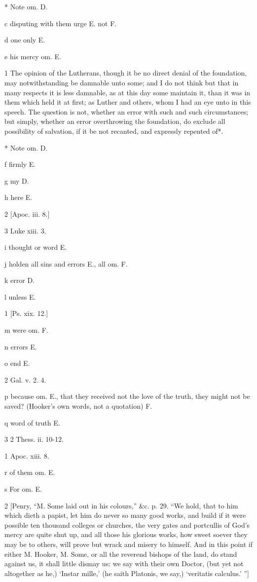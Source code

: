 *
Note om. D.

c
disputing with them urge E. not F.

d
one only E.

e
his mercy om. E.

1
The opinion of the Lutherans, though it be no direct denial of the foundation, may notwithstanding be damnable unto some; and I do not think but that in many respects it is less damnable, as at this day some maintain it, than it was in them which held it at first; as Luther and others, whom I had an eye unto in this speech. The question is not, whether an error with such and such circumstances; but simply, whether an error overthrowing the foundation, do exclude all possibility of salvation, if it be not recanted, and expressly repented of*.

*
Note om. D.

f
firmly E.

g
my D.

h
here E.

2
[Apoc. iii. 8.]

3
Luke xiii. 3.

i
thought or word E.

j
holden all sins and errors E., all om. F.

k
error D.

l
unless E.

1
[Ps. xix. 12.]

m
were om. F.

n
errors E.

o
end E.

2
Gal. v. 2. 4.

p
because om. E., that they received not the love of the truth, they might not be saved? (Hooker’s own words, not a quotation) F.

q
word of truth E.

3
2 Thess. ii. 10-12.

1
Apoc. xiii. 8.

r
of them om. E.

s
For om. E.

2
[Penry, “M. Some laid out in his colours,” &c. p. 29. “We hold, that to him which dieth a papist, let him do never so many good works, and build if it were possible ten thousand colleges or churches, the very gates and portcullis of God’s mercy are quite shut up, and all those his glorious works, how sweet soever they may be to others, will prove but wrack and misery to himself. And in this point if either M. Hooker, M. Some, or all the reverend bishops of the land, do stand against us, it shall little dismay us: we say with their own Doctor, (but yet not altogether as he,) ‘Instar mille,’ (he saith Platonis, we say,) ‘veritatis calculus.’ ”]

